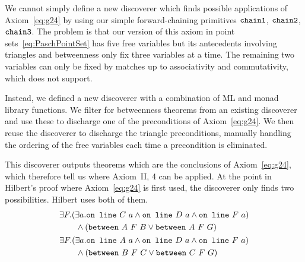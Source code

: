 We cannot simply define a new discoverer which finds possible applications of Axiom~\ref{eq:g24} by using our simple forward-chaining primitives $\texttt{chain1}$, $\texttt{chain2}$, $\texttt{chain3}$. The problem is that our version of this axiom in point sets~\eqref{eq:PaschPointSet} has five free variables but its antecedents involving triangles and betweenness only fix three variables at a time. The remaining two variables can only be fixed by matches up to associativity and commutativity, which  does not support.

Instead, we defined a new discoverer  with a combination of ML and monad library functions. We filter for betweenness theorems from an existing discoverer and use these to discharge one of the preconditions of Axiom~\ref{eq:g24}. We then reuse the discoverer  to discharge the triangle preconditions, manually handling the ordering of the free variables each time a precondition is eliminated. 

This discoverer outputs theorems which are the conclusions of Axiom~\ref{eq:g24}, which therefore tell us where Axiom~II, 4 can be applied. At the point in Hilbert's proof where Axiom~\ref{eq:g24} is first used, the discoverer only finds two possibilities. Hilbert uses both of them.
\begin{gather*}
\begin{split}
&\exists F. (\exists a. \code{on\ line}\ C\ a \wedge \code{on\ line}\ D\ a \wedge \code{on\ line}\ F\ a)\\
&\qquad \wedge (\between{A}{F}{B} \vee \between{A}{F}{G})
\end{split}\\
\begin{split}
&\exists F. (\exists a. \code{on\ line}\ A\ a \wedge \code{on\ line}\ D\ a \wedge \code{on\ line}\ F\ a)\\
&\qquad \wedge (\between{B}{F}{C} \vee \between{C}{F}{G})
\end{split}
\end{gather*}

